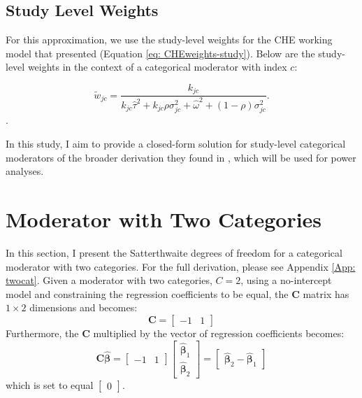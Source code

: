 \subsection{Study Level Weights}

For this approximation, we use the study-level weights for the CHE working model that \textcite{vembye2023} presented (Equation \ref{eq: CHEweights-study}). Below are the study-level weights in the context of a categorical moderator with index $c$: 

\begin{equation} \label{eq: CHEweights-study_cat}
    \tilde{w}_{jc} = \frac{k_{jc}}{k_{jc}\hat{\tau}^2 + k_{jc}\rho\sigma_{jc}^2 +\hat{\omega}^2 + (1- \rho)\sigma_{jc}^2}.
\end{equation}.

In this study, I aim to provide a closed-form solution for study-level categorical moderators of the broader derivation they found in \textcite{tipton2015b}, which will be used for power analyses.  


 \section{Moderator with Two Categories}

 In this section, I present the Satterthwaite degrees of freedom for a categorical moderator with two categories. For the full derivation, please see Appendix \ref{App: twocat}. Given a moderator with two categories, $C=2$, using a no-intercept model and constraining the regression coefficients to be equal, the $\mathbf{C}$ matrix has $1 \times 2$ dimensions and becomes:
 \begin{equation}
     \mathbf{C} = 
     \begin{bmatrix} 
     -1 & 1 
     \end{bmatrix}
     \nonumber
 \end{equation}
Furthermore, the $\mathbf{C}$ multiplied by the vector of regression coefficients becomes:
 \begin{equation}
     \mathbf{C} \bm{\hat{\beta}}= 
     \begin{bmatrix} 
     -1 & 1 \end{bmatrix}\begin{bmatrix}\bm{\hat{\beta}}_1 \\
     \bm{\hat{\beta}}_2 \end{bmatrix}  = \begin{bmatrix}
         \bm{\hat{\beta}}_2 - \bm{\hat{\beta} }_1
     \end{bmatrix}
     \nonumber
 \end{equation}
 which is set to equal $\begin{bmatrix}
     0 
 \end{bmatrix}$. 

